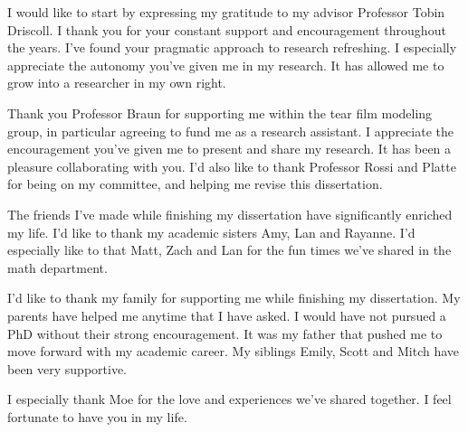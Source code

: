 I would like to start by expressing my gratitude to my advisor Professor Tobin Driscoll. I thank you for your constant support and encouragement throughout the years. I've found your pragmatic approach to research refreshing. I especially appreciate the autonomy you've given me in my research. It has allowed me to grow into a researcher in my own right.

Thank you Professor Braun for supporting me within the tear film modeling group, in particular agreeing to fund me as a research assistant. I appreciate the encouragement you've given me to present and share my research. It has been a pleasure collaborating with you. I'd also like to thank Professor Rossi and Platte for being on my committee, and helping me revise this dissertation.

The friends I've made while finishing my dissertation have significantly enriched my life. I'd like to thank my academic sisters Amy, Lan and Rayanne. I'd especially like to that Matt, Zach and Lan for the fun times we've shared in the math department.

I'd like to thank my family for supporting me while finishing my dissertation. My parents have helped me anytime that I have asked. I would have not pursued a PhD without their strong encouragement. It was my father that pushed me to move forward with my academic career. My siblings Emily, Scott and Mitch have been very supportive.

I especially thank Moe for the love and experiences we've shared together. I feel fortunate to have you in my life.